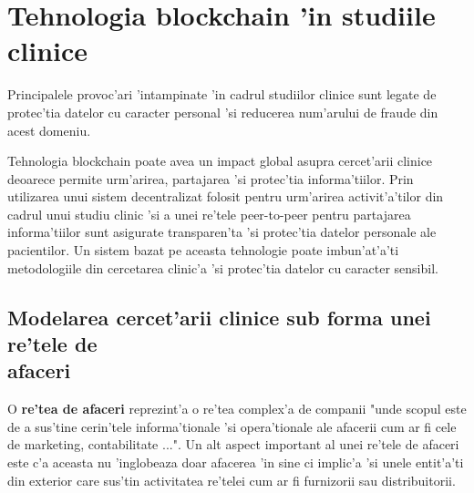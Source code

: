 \documentclass[12pt,a4paper,twoside]{report}
\begin{document}
\section{Tehnologia blockchain 'in studiile clinice}
Principalele provoc'ari 'intampinate 'in cadrul studiilor clinice sunt legate de protec'tia datelor cu caracter personal 'si reducerea num'arului de fraude din acest domeniu.

Tehnologia blockchain poate avea un impact global asupra cercet'arii clinice deoarece permite urm'arirea, partajarea 'si protec'tia informa'tiilor. Prin utilizarea unui sistem decentralizat folosit pentru urm'arirea activit'a'tilor din cadrul unui studiu clinic 'si a unei re'tele peer-to-peer pentru partajarea informa'tiilor sunt asigurate transparen'ta 'si protec'tia datelor personale ale pacientilor. Un sistem bazat pe aceasta tehnologie poate imbun'at'a'ti metodologiile din cercetarea clinic'a 'si protec'tia datelor cu caracter sensibil.

\subsection{Modelarea cercet'arii clinice sub forma unei re'tele de\\ afaceri}

	O \textbf{re'tea de afaceri} reprezint'a o re'tea complex'a de companii "unde scopul este de a sus'tine cerin'tele informa'tionale 'si opera'tionale ale afacerii cum ar fi cele de marketing, contabilitate ..."\cite{bndef}. Un alt aspect important al unei re'tele de afaceri este c'a aceasta nu 'inglobeaza doar afacerea 'in sine ci implic'a 'si unele entit'a'ti din exterior care sus'tin activitatea re'telei cum ar fi furnizorii sau distribuitorii. 
	
\end{document}

